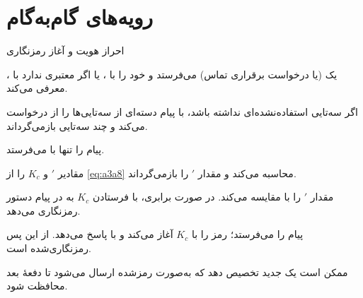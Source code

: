 \documentclass[11pt,a4paper]{article}
\begin{document}
\begin{acnfigure}
  \caption{شبکهٔ  همراه با لایهٔ افزودهٔ . خاکستری توپر: پیوندهای انتقال؛
  فیروزه‌ای: پیوندهای سوئیچ بسته‌ای؛ آبی خط‌چین: سیگنالینگ  به سوی  و .}
  \label{fig:arch}
\end{acnfigure}

\begin{acnfigure}
  \caption{ساختار زمانی . یک چندقاب ۲۶تایی (\qty{120}{\milli\second}) شامل ۲۴ قاب
  ترافیک، یک قاب  و یک قاب بیکار است؛ هر قاب  هشت شیار زمانی دارد؛
  یک بُرست عادی ۱۱۴ بیت داده حمل می‌کند.}
  \label{fig:tdma}
\end{acnfigure}

\section{رویه‌های گام‌به‌گام}\label{sec:procedures}

\begin{procedurebox}{احراز هویت و آغاز رمزنگاری}\label{proc:auth}
\begin{steps}
  \item {} یک  (یا درخواست برقراری تماس) می‌فرستد و
        خود را با ، یا اگر  معتبری ندارد با ، معرفی می‌کند.
  \item اگر  سه‌تایی استفاده‌نشده‌ای نداشته باشد، با پیام 
         دسته‌ای از سه‌تایی‌ها را از  درخواست
        می‌کند و  چند سه‌تایی بازمی‌گرداند.
  \item {} پیام  را تنها با  می‌فرستد.
  \item {} مقادیر $'$ و $K_c$ را از \cref{eq:a3a8} محاسبه می‌کند و 
        مقدار $'$ را بازمی‌گرداند.
  \item {} مقدار $'$ را با  مقایسه می‌کند. در صورت برابری، با فرستادن
        $K_c$ به  در پیام   دستور رمزنگاری می‌دهد.
  \item {} پیام  را می‌فرستد؛  رمز  را با
        $K_c$ آغاز می‌کند و با  پاسخ می‌دهد. از این پس 
        رمزنگاری‌شده است.
  \item {} ممکن است یک  جدید تخصیص دهد که به‌صورت رمزشده ارسال می‌شود تا
        دفعهٔ بعد  محافظت شود.
\end{steps}
\end{procedurebox}
\end{document}
